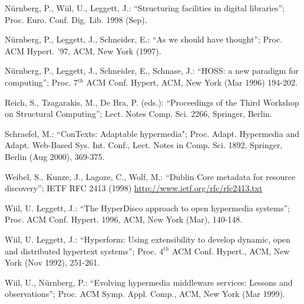 \documentclass[10pt, a4paper, oneside]{article}
\begin{document}
\begin{thebibliography}{}
{ N\"{u}rnberg, P., Wiil, U.,
Leggett, J.: ``Structuring facilities in digital libraries'';
Proc. Euro. Conf. Dig. Lib. 1998 (Sep).

 N\"{u}rnberg, P., Leggett,
J., Schneider, E.: ``As we should have thought''; Proc. ACM Hypert.
'97, ACM, New York (1997).

 N\"{u}rnberg, P., Leggett,
J., Schneider, E., Schnase, J.: ``HOSS: a new paradigm for
computing''; Proc. 7$^{th}$ ACM Conf. Hypert, ACM, New York (Mar
1996) 194-202.

 Reich, S., Tzagarakis, M., De
Bra, P. (eds.): ``Proceedings of the Third Workshop on Structural
Computing''; Lect. Notes Comp. Sci. 2266, Springer, Berlin.

 Schraefel, M.: ``ConTexts: Adaptable
hypermedia"; Proc. Adapt. Hypermedia and Adapt. Web-Based
Sys. Int. Conf., Lect. Notes in Comp. Sci. 1892, Springer, Berlin (Aug
2000), 369-375.

 Weibel, S., Kunze, J.,
Lagoze, C., Wolf, M.: ``Dublin Core metadata for resource discovery'';
IETF RFC 2413 (1998) \url{http://www.ietf.org/rfc/rfc2413.txt}

 Wiil, U. Leggett, J.:
``The HyperDisco approach to open hypermedia systems''; Proc. ACM
Conf. Hypert. 1996, ACM, New York (Mar), 140-148.

 Wiil, U. Leggett, J.:
``Hyperform: Using extensibility to develop dynamic, open and
distributed hypertext systems''; Proc. 4$^{th}$ ACM Conf. Hypert.,
ACM, New York (Nov 1992), 251-261.

 Wiil, U.,
N\"{u}rnberg, P.: ``Evolving hypermedia middleware services: Lessons
and observations''; Proc. ACM Symp. Appl. Comp., ACM, New York (Mar
1999).
}\end{thebibliography}
\end{document}

